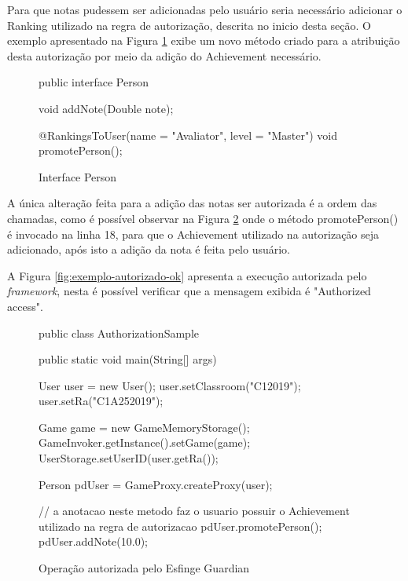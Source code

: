 \par Para que notas pudessem ser adicionadas pelo usuário seria necessário adicionar o Ranking utilizado na regra de autorização, descrita no inicio desta seção. O exemplo apresentado na Figura \ref{fig:autorizacao-ok} exibe um novo método criado para a atribuição desta autorização por meio da adição do Achievement necessário.

\begin{figure}[H]
    \centering
    \caption{Interface Person}
    \begin{java}
public interface Person {

	void addNote(Double note);

	@RankingsToUser(name = "Avaliator", level = "Master")
	void promotePerson();
}
    \end{java}
    \label{fig:autorizacao-ok}
\end{figure}

\par A única alteração feita para a adição das notas ser autorizada é a ordem das chamadas, como é possível observar na Figura \ref{fig:hellow-world-gamification-autorizada} onde o método promotePerson() é invocado na linha 18, para que o Achievement utilizado na autorização seja adicionado, após isto a adição da nota é feita pelo usuário.

\par A Figura \ref{fig:exemplo-autorizado-ok} apresenta a execução autorizada pelo \textit{framework}, nesta é possível verificar que a mensagem exibida é "Authorized access".

\begin{figure}[H]
    \centering
    \caption{Operação autorizada pelo Esfinge Guardian}
    \begin{java}
public class AuthorizationSample {

	public static void main(String[] args) {

		User user = new User();
		user.setClassroom("C12019");
		user.setRa("C1A252019");
		
		Game game = new GameMemoryStorage();
    	         GameInvoker.getInstance().setGame(game);
		UserStorage.setUserID(user.getRa());

		Person pdUser = GameProxy.createProxy(user);
		
		// a anotacao neste metodo faz o usuario possuir o Achievement utilizado na regra de autorizacao
		pdUser.promotePerson();
		pdUser.addNote(10.0);

	}
}
    \end{java}
    \label{fig:hellow-world-gamification-autorizada}
\end{figure}

